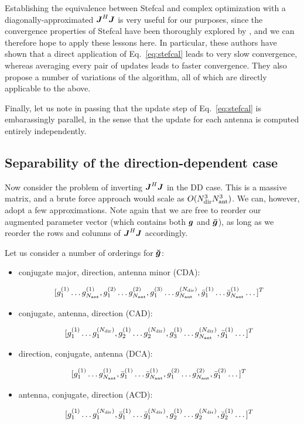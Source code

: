 \documentclass[useAMS,usenatbib]{mn2e}
\newcommand{\mat}[1]{{\bmath{#1}}}
\newcommand{\JJ}{\mat{J}} %
\newcommand{\JHJ}{\JJ^H\JJ} %
\begin{document}
Establishing the equivalence between Stefcal and complex optimization with a diagonally-approximated $\JJ^H\JJ$ is 
very useful for our purposes, since the convergence properties of Stefcal have been thoroughly explored 
by \citet{Stefcal}, and we can therefore hope to apply these lessons here. In particular, these authors have shown 
that a direct application of Eq.~\ref{eq:stefcal} leads to very slow convergence, whereas averaging every pair of 
updates leads to faster convergence. They also propose a number of variations of the algorithm, all of which are 
directly applicable to the above.

Finally, let us note in passing that the update step of Eq.~\ref{eq:stefcal} is embarassingly parallel, in the sense 
that the update for each antenna is computed entirely independently.

\subsection{Separability of the direction-dependent case}

Now consider the problem of inverting $\JHJ$ in the DD case. This is a massive matrix, and a brute force 
approach would scale as $O(N_\mathrm{dir}^3N_\mathrm{ant}^3)$. We can, however, adopt a few approximations. Note again that we are 
free to reorder our augmented parameter vector (which contains both $\bmath{g}$ and $\bmath{\bar g}$), 
as long as we reorder the rows and columns of $\JHJ$ accordingly.

Let us consider a number of orderings for $\Gg$:

\begin{itemize}
\item conjugate major, direction, antenna minor (CDA):

\[
[g^{(1)}_1 \dots g^{(1)}_{N_\mathrm{ant}}, g^{(2)}_1 \dots g^{(2)}_{N_\mathrm{ant}}, g^{(3)}_1 \dots g^{(N_\mathrm{dir})}_{N_\mathrm{ant}}, 
 \bar{g}^{(1)}_1 \dots \bar{g}^{(1)}_{N_\mathrm{ant}} \dots ]^T
\]

\item conjugate, antenna, direction (CAD):

\[
[g^{(1)}_1 \dots g^{(N_\mathrm{dir})}_1, g^{(1)}_2 \dots g^{(N_\mathrm{dir})}_2, g^{(1)}_3 \dots g^{(N_\mathrm{dir})}_{N_\mathrm{ant}}, 
 \bar{g}^{(1)}_1 \dots ]^T
\]

\item direction, conjugate, antenna (DCA):

\[
[g^{(1)}_1 \dots g^{(1)}_{N_\mathrm{ant}},\bar{g}^{(1)}_1 \dots \bar{g}^{(1)}_{N_\mathrm{ant}},
g^{(2)}_1 \dots g^{(2)}_{N_\mathrm{ant}}, \bar{g}^{(2)}_1 \dots ]^T
\]

\item antenna, conjugate, direction (ACD):

\[
[g^{(1)}_1 \dots g^{(N_\mathrm{dir})}_1,\bar{g}^{(1)}_1 \dots \bar{g}^{(N_\mathrm{dir})}_1,
g^{(1)}_2 \dots g^{(N_\mathrm{dir})}_2, \bar{g}^{(1)}_2 \dots ]^T
\]

\end{itemize}
\end{document}
